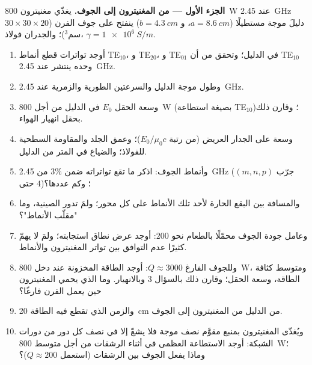 \begin{problem}
\label{pb:b2:guided-waves:1}

\medskip
\noindent\textbf{الجزء الأول --- من المغنيترون إلى الجوف.}
يغذّي مغنيترون \qty{800}{W} عند \qty{2.45}{GHz} دليلَ موجة مستطيلًا
($a = \qty{8.6}{cm}$، و $b = \qty{4.3}{cm}$) ينفتح على جوف
الفرن ($30 \times 30 \times 20$ سم$^3$)؛ والجدران فولاذ، $\gamma = \qty{1e6}{S/m}$.
\begin{enumerate}
  \item أوجد تواترات قطع أنماط TE$_{10}$، و TE$_{20}$، و TE$_{01}$ في الدليل؛
        وتحقق من أن TE$_{10}$ وحده ينتشر عند \qty{2.45}{GHz}.
  \item وطول موجة الدليل والسرعتين الطورية والزمرية عند \qty{2.45}{GHz}.
  \item وسعة الحقل $E_0$ في الدليل من أجل \qty{800}{W} (بصيغة استطاعة
        TE$_{10}$)؛ وقارن ذلك بحقل انهيار الهواء.
  \item وسعة  على الجدار العريض (من رتبة
        $E_0/\mu_0c$)؛ وعمق الجلد والمقاومة السطحية للفولاذ؛
        والضياع في المتر من الدليل.
  \item وأنماط الجوف: اذكر ما تقع تواتراته ضمن $3\%$
        من \qty{2.45}{GHz} (جرّب $(m, n, p)$ حتى $4$)؛ وكم عددها؟
  \item والمسافة بين البقع الحارة لأحد تلك الأنماط على كل
        محور؛ ولمَ تدور الصينية، وما "مقلّب الأنماط"؟
  \item وعامل جودة الجوف محمّلًا بالطعام نحو
        $200$: أوجد عرض نطاق استجابته؛ ولمَ لا يهمّ كثيرًا عدم التوافق
        بين تواتر المغنيترون والأنماط.
  \item وللجوف الفارغ $Q \approx 3000$: أوجد الطاقة المخزونة عند دخل
        \qty{800}{W}، ومتوسط كثافة الطاقة، وسعة الحقل؛ وقارن ذلك
        بالسؤال 3 وبالانهيار. وما الذي يحمي المغنيترون
        حين يعمل الفرن فارغًا؟
  \item والزمن الذي تقطع فيه الطاقة \qty{20}{cm} من الدليل من
        المغنيترون إلى الجوف.
  \item ويُغذّى المغنيترون بمنبع مقوَّم نصف موجة فلا يشعّ
        إلا في نصف كل دور من دورات الشبكة: أوجد الاستطاعة العظمى في أثناء
        الرشقات من أجل متوسط \qty{800}{W}؛ وماذا يفعل الجوف
        بين الرشقات (استعمل $Q \approx 200$)؟
\end{enumerate}


\end{problem}
